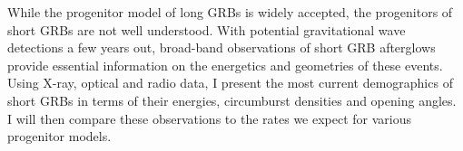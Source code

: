 


\bigskip



\bigskip

\noindent While the progenitor model of long GRBs is widely accepted, the progenitors of short GRBs are not well understood. With potential gravitational wave detections a few years out, broad-band observations of short GRB afterglows provide essential information on the energetics and geometries of these events. Using X-ray, optical and radio data, I present the most current demographics of short GRBs in terms of their energies, circumburst densities and opening angles. I will then compare these observations to the rates we expect for various progenitor models.
